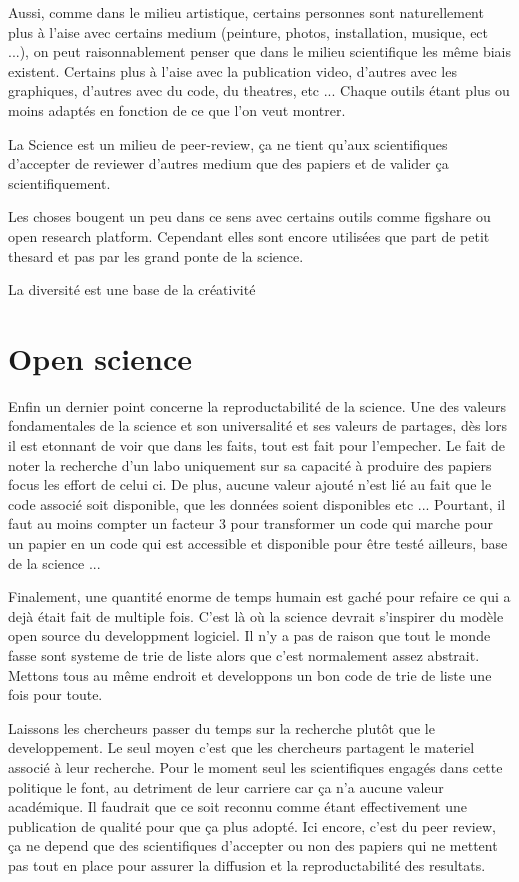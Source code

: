 Aussi, comme dans le milieu artistique, certains personnes sont naturellement plus à l'aise avec certains medium (peinture, photos, installation, musique, ect ...), on peut raisonnablement penser que dans le milieu scientifique les même biais existent. Certains plus à l'aise avec la publication video, d'autres avec les graphiques, d'autres avec du code, du theatres,  etc ... Chaque outils étant plus ou moins adaptés en fonction de ce que l'on veut montrer.

La Science est un milieu de peer-review, ça ne tient qu'aux scientifiques d'accepter de reviewer d'autres medium que des papiers et de valider ça scientifiquement.


Les choses bougent un peu dans ce sens avec certains outils comme figshare ou open research platform. Cependant elles sont encore utilisées que part de petit thesard et pas par les grand ponte de la science.

La diversité est une base de la créativité

\section{Open science} %
Enfin un dernier point concerne la reproductabilité de la science. Une des valeurs fondamentales de la science et son universalité et ses valeurs de partages, dès lors il est etonnant de voir que dans les faits, tout est fait pour l'empecher. Le fait de noter la recherche d'un labo uniquement sur sa capacité à produire des papiers focus les effort de celui ci. De plus, aucune valeur ajouté n'est lié au fait que le code associé soit disponible, que les données soient disponibles etc ... Pourtant, il faut au moins compter un facteur 3 pour transformer un code qui marche pour un papier en un code qui est accessible et disponible pour être testé ailleurs, base de la science ...


Finalement, une quantité enorme de temps humain est gaché pour refaire ce qui a dejà était fait de multiple fois. C'est là où la science devrait s'inspirer du modèle open source du developpment logiciel. Il n'y a pas de raison que tout le monde fasse sont systeme de trie de liste alors que c'est normalement assez abstrait. Mettons tous au même endroit et developpons un bon code de trie de liste une fois pour toute.

Laissons les chercheurs passer du temps sur la recherche plutôt que le developpement. Le seul moyen c'est que les chercheurs partagent le materiel associé à leur recherche. Pour le moment seul les scientifiques engagés dans cette politique le font, au detriment de leur carriere car ça n'a aucune valeur académique. Il faudrait que ce soit reconnu comme étant effectivement une publication de qualité pour que ça plus adopté.
Ici encore, c'est du peer review, ça ne depend que des scientifiques d'accepter ou non des papiers qui ne mettent pas tout en place pour assurer la diffusion et la reproductabilité des resultats.


